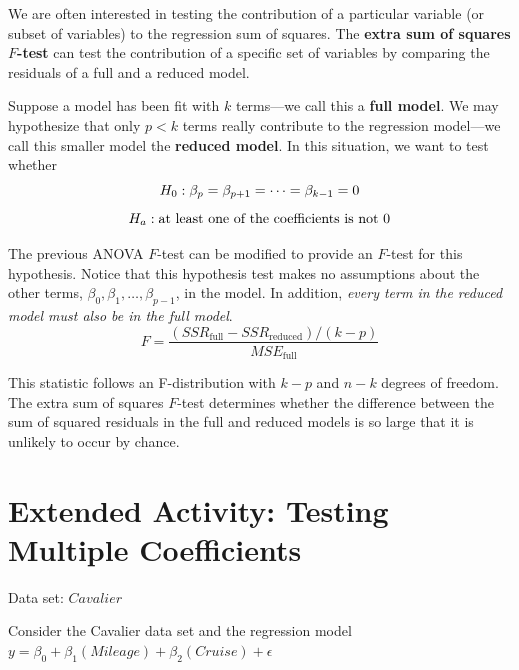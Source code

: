 \documentclass[
]{report}
\begin{document}
We are often interested in testing the contribution of a particular variable (or subset of variables) to the regression sum of squares. The \textbf{extra sum of squares \(F\)-test} can test the contribution of a specific set of variables by comparing the residuals of a full and a reduced model.

Suppose a model has been fit with \(k\) terms---we call this a \textbf{full model}. We may hypothesize that only \(p < k\) terms really contribute to the regression model---we call this smaller model the \textbf{reduced model}. In this situation, we want to test whether
\begin{equation}
H_0: \beta_p = \beta_{p+1} = \dots = \beta_{k-1} = 0 
\notag
\end{equation}
\begin{equation}
H_a: \text{at least one of the coefficients is not }0 
\notag
\end{equation}

The previous ANOVA \(F\)-test can be modified to provide an \(F\)-test for this hypothesis. Notice that this hypothesis test makes no assumptions about the other terms, \(\beta_0, \beta_1, \dots, \beta_{p-1}\), in the model. In addition, \emph{every term in the reduced model must also be in the full model}.
\begin{equation}
 F = \frac{(SSR_{\text{full}} - SSR_{\text{reduced}})/(k - p)}{MSE_{\text{full}}}
 \tag{3.12}
\end{equation}

This statistic follows an F-distribution with \(k-p\) and \(n-k\) degrees of freedom. The extra sum of squares \(F\)-test determines whether the difference between the sum of squared residuals in the full and reduced models is so large that it is unlikely to occur by chance.

\hypertarget{extended-activity-testing-multiple-coefficients}{%
\section*{Extended Activity: Testing Multiple Coefficients}\label{extended-activity-testing-multiple-coefficients}}

Data set: \(Cavalier\)

Consider the Cavalier data set and the regression model \(y = \beta_0 + \beta_1(Mileage) + \beta_2(Cruise) + \epsilon\)
\end{document}
